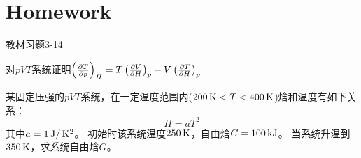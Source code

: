 \documentclass[CJK]{beamer}
\begin{document}
\section{Homework}

\begin{frame}
  \bch
  {\small 
  \bitem
\item{教材习题3-14}
\item{对$pVT$系统证明$\left(\frac{\partial T}{\partial p}\right)_{H} = T \left(\frac{\partial V}{\partial H}\right)_{p} - V\left(\frac{\partial T}{\partial H}\right)_{p}$}
\item{某固定压强的$pVT$系统，在一定温度范围内($200\,\mathrm{K} < T< 400 \,\mathrm{K}$)焓和温度有如下关系：
  $$H =  aT^2 $$
  其中$a=1 \,\mathrm{J}/\,\mathrm{K}^2$。
  初始时该系统温度$250\,\mathrm{K}$，自由焓$G = 100 \,\mathrm{kJ}$。
  当系统升温到$350\,\mathrm{K}$，求系统自由焓$G$。
}
  \eitem
  }
  \ech
\end{frame}
\end{document}
